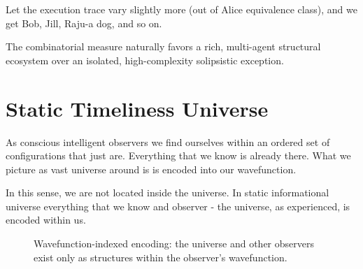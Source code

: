 Let the execution trace vary slightly more (out of Alice equivalence class), and we get Bob, Jill,  Raju-a dog, and so on.

The combinatorial measure naturally favors a rich, multi-agent structural ecosystem over an isolated, high-complexity solipsistic exception.


\section{Static Timeliness Universe}

As conscious intelligent observers we find ourselves within an ordered set of configurations that just are. Everything
that we know is already there. What we picture as vast universe around is is encoded into our wavefunction.

In this sense, we are not located inside the universe.
In static informational universe everything that we know and observer - the universe, as experienced, is encoded within us. 

\begin{figure}[h]
    \centering
    \caption{Wavefunction-indexed encoding: the universe and other observers exist only as structures within the observer’s wavefunction.}
\end{figure}

